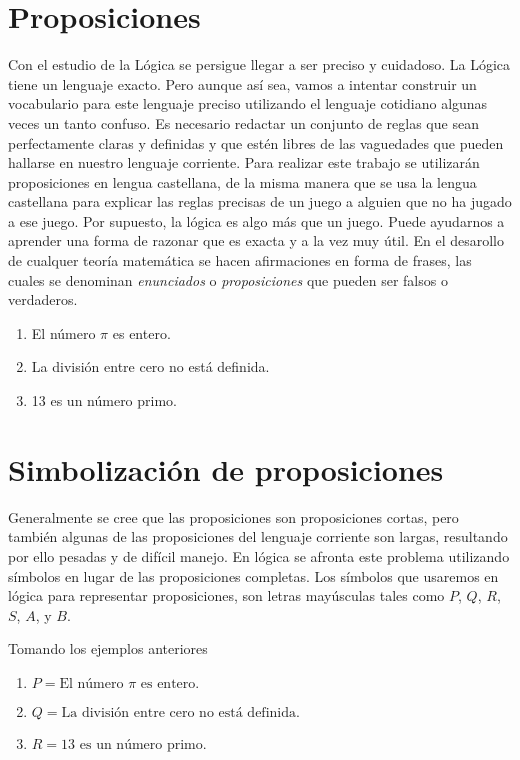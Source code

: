 \section{Proposiciones}

Con el estudio de la Lógica se persigue llegar a ser preciso y cuidadoso. La Lógica tiene un lenguaje exacto. Pero aunque así sea, vamos a intentar construir un vocabulario para este lenguaje preciso utilizando el lenguaje cotidiano algunas veces un tanto confuso. Es necesario redactar un conjunto de reglas que sean perfectamente claras y definidas y que estén libres de las vaguedades que pueden hallarse en nuestro lenguaje corriente. Para realizar este trabajo se utilizarán proposiciones en lengua castellana, de la misma manera que se usa la lengua castellana para explicar las reglas precisas de un juego a alguien que no ha jugado a ese juego. Por supuesto, la lógica es algo más que un juego. Puede ayudarnos a aprender una forma de razonar que es exacta y a la vez muy útil. En el desarollo de cualquer teoría matemática se hacen afirmaciones en forma de frases, las cuales se denominan \emph{enunciados} o \emph{proposiciones} que pueden ser falsos o verdaderos.

\begin{myexamples}
    \begin{enumerate}
        \item El número $\pi$ es entero.
        \item La división entre cero no está definida.
        \item 13 es un número primo.
    \end{enumerate}
\end{myexamples}


\section{Simbolización de proposiciones}

Generalmente se cree que las proposiciones son proposiciones cortas, pero también algunas de las proposiciones del lenguaje corriente son largas, resultando por ello pesadas y de difícil manejo. En lógica se afronta este problema utilizando símbolos en lugar de las proposiciones completas. Los símbolos que usaremos en lógica para representar proposiciones, son letras mayúsculas tales como $P$, $Q$, $R$, $S$, $A$, y $B$.

\begin{myexamples}
    Tomando los ejemplos anteriores
    \begin{enumerate}
        \item $P=\text{El número } \pi \text{ es entero.}$
        \item $Q=\text{La división entre cero no está definida.}$
        \item $R=13 \text{ es un número primo.}$
    \end{enumerate}
\end{myexamples}


